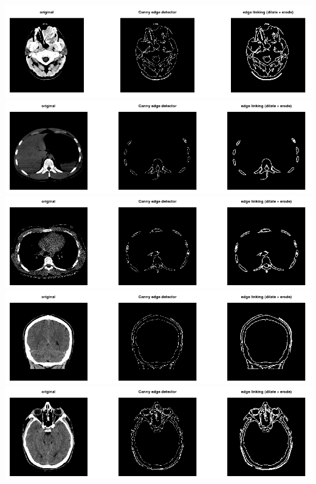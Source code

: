 \documentclass[fleqn,moreauthors,10pt]{ds_report}
\begin{document}
\includegraphics[width=\linewidth]{001.png}
\includegraphics[width=\linewidth]{002.png}
\includegraphics[width=\linewidth]{004.png}
\includegraphics[width=\linewidth]{005.png}
\includegraphics[width=\linewidth]{006.png}


% 
\end{document}
